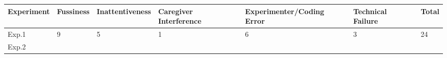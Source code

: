 \documentclass[]{article}
\begin{document}
\begin{longtable}[]{@{}lllllll@{}}
\toprule
\begin{minipage}[b]{0.08\columnwidth}\raggedright\strut
Experiment\strut
\end{minipage} & \begin{minipage}[b]{0.07\columnwidth}\raggedright\strut
Fussiness\strut
\end{minipage} & \begin{minipage}[b]{0.12\columnwidth}\raggedright\strut
Inattentiveness\strut
\end{minipage} & \begin{minipage}[b]{0.17\columnwidth}\raggedright\strut
Caregiver Interference\strut
\end{minipage} & \begin{minipage}[b]{0.19\columnwidth}\raggedright\strut
Experimenter/Coding Error\strut
\end{minipage} & \begin{minipage}[b]{0.13\columnwidth}\raggedright\strut
Technical Failure\strut
\end{minipage} & \begin{minipage}[b]{0.04\columnwidth}\raggedright\strut
Total\strut
\end{minipage}\tabularnewline
\midrule
\endhead
\begin{minipage}[t]{0.08\columnwidth}\raggedright\strut
Exp.1\strut
\end{minipage} & \begin{minipage}[t]{0.07\columnwidth}\raggedright\strut
9\strut
\end{minipage} & \begin{minipage}[t]{0.12\columnwidth}\raggedright\strut
5\strut
\end{minipage} & \begin{minipage}[t]{0.17\columnwidth}\raggedright\strut
1\strut
\end{minipage} & \begin{minipage}[t]{0.19\columnwidth}\raggedright\strut
6\strut
\end{minipage} & \begin{minipage}[t]{0.13\columnwidth}\raggedright\strut
3\strut
\end{minipage} & \begin{minipage}[t]{0.04\columnwidth}\raggedright\strut
24\strut
\end{minipage}\tabularnewline
\begin{minipage}[t]{0.08\columnwidth}\raggedright\strut
Exp.2\strut
\end{minipage} & \begin{minipage}[t]{0.07\columnwidth}\raggedright\strut

\end{minipage}
\end{longtable}
\end{document}
